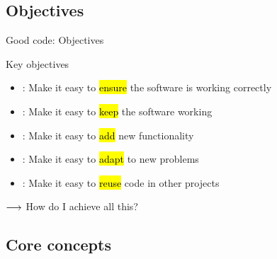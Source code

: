 
\subsection{Objectives}


\begin{frame}{Good code: Objectives}
\begin{block}{Key objectives}{\relax}
	\begin{itemize}
		\item {}: Make it easy to \hl{ensure} the software is working correctly
		\item {}: Make it easy to \hl{keep} the software working 
		\item {}: Make it easy to \hl{add} new functionality
		\item {}: Make it easy to \hl{adapt} to new problems
		\item {}: Make it easy to \hl{reuse} code in other projects
	\end{itemize}
\end{block}

\bigskip
{\Large $\longrightarrow$ How do I achieve all this?}

\end{frame}

\subsection{Core concepts}

